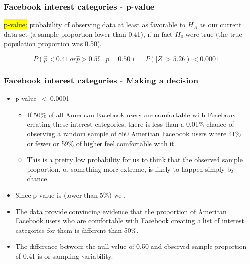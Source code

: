
\begin{frame}
\frametitle{Facebook interest categories - p-value}

\hl{p-value:} probability of observing data at least as favorable to $H_A$ as our current data set (a sample proportion lower than 0.41), if in fact $H_0$ were true (the true population proportion was 0.50).

\pause

\[ P(\hat{p} < 0.41~or\hat{p} > 0.59~|~p = 0.50) = P(|Z| > 5.26) < 0.0001 \]

\end{frame}


\begin{frame}
\frametitle{Facebook interest categories - Making a decision}

\begin{itemize}

\item p-value $<$ 0.0001

\pause

\begin{itemize}
\item If 50\% of all American Facebook users are comfortable with Facebook creating these interest categories, there is less than a 0.01\% chance of observing a random sample of 850 American Facebook users where 41\% or fewer or 59\% of higher feel comfortable with it.
\pause
\item This is a pretty low probability for us to think that the observed sample proportion, or something more extreme, is likely to happen simply by chance.
\end{itemize}

\pause
\item Since p-value is  (lower than 5\%) we .

\pause
\item The data provide convincing evidence that the proportion of American Facebook users who are comfortable with Facebook creating a list of interest categories for them is different than 50\%.

\pause
\item The difference between the null value of 0.50 and observed sample proportion of 0.41 is  or sampling variability.

\end{itemize}

\end{frame}

